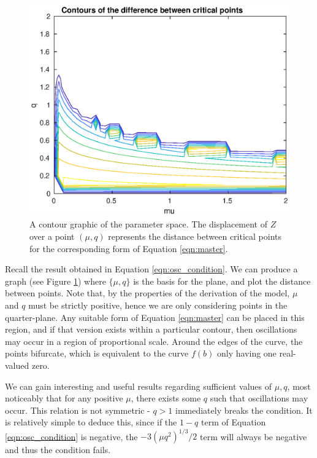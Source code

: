 \documentclass{article}
\begin{document}
\begin{figure}
	\centering
	\includegraphics[width=\linewidth]{param_space}
	\caption{A contour graphic of the parameter space. The displacement of $Z$ over a point $(\mu,q)$ represents the distance between critical points for the corresponding form of Equation \ref{eqn:master}.}
	\label{fig:param_space}
\end{figure}

Recall the result obtained in Equation \ref{eqn:osc_condition}.
We can produce a graph (see Figure \ref{fig:param_space}) where $\{\mu, q\}$ is the basis for the plane, and plot the distance between points.
Note that, by the properties of the derivation of the model,
$\mu$ and $q$ must be strictly positive,
hence we are only considering points in the quarter-plane.
Any suitable form of Equation \ref{eqn:master} can be placed in this region,
and if that version exists within a particular contour,
then oscillations may occur in a region of proportional scale.
Around the edges of the curve, the points bifurcate,
which is equivalent to the curve $f(b)$ only having one real-valued zero.

We can gain interesting and useful results regarding sufficient values of $\mu, q$,
most noticeably that for any positive $\mu$, there exists some $q$ such that oscillations may occur.
This relation is not symmetric - $q>1$ immediately breaks the condition.
It is relatively simple to deduce this, since if the $1-q$ term of Equation \ref{eqn:osc_condition} is negative,
the $-3(\mu q^2)^{1/3}/2$ term will always be negative and thus the condition fails.
\end{document}
